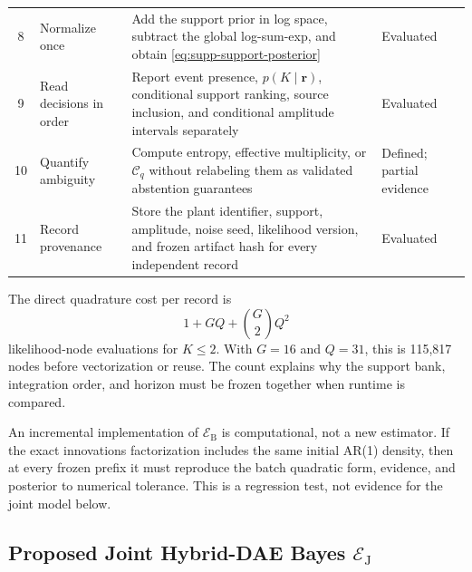 \begin{table}[t]
\begin{tabularx}{\textwidth}{@{}c l X l@{}}
8 & Normalize once & Add the support prior in log space, subtract the global log-sum-exp, and obtain \eqref{eq:supp-support-posterior} & Evaluated \\
9 & Read decisions in order & Report event presence, $p(K\mid\bm r)$, conditional support ranking, source inclusion, and conditional amplitude intervals separately & Evaluated \\
10 & Quantify ambiguity & Compute entropy, effective multiplicity, or $\mathcal C_q$ without relabeling them as validated abstention guarantees & Defined; partial evidence \\
11 & Record provenance & Store the plant identifier, support, amplitude, noise seed, likelihood version, and frozen artifact hash for every independent record & Evaluated \\
\bottomrule
\end{tabularx}
\end{table}

The direct quadrature cost per record is
\begin{equation}
 1+GQ+\binom{G}{2}Q^2
 \label{eq:supp-gh-complexity}
\end{equation}
likelihood-node evaluations for $K\le2$. With $G=16$ and $Q=31$, this is 115,817 nodes before vectorization or reuse. The count explains why the support bank, integration order, and horizon must be frozen together when runtime is compared.

An incremental implementation of $\mathcal E_{\mathrm B}$ is computational,
not a new estimator. If the exact innovations factorization includes the same
initial AR(1) density, then at every frozen prefix it must reproduce the batch
quadratic form, evidence, and posterior to numerical tolerance. This is a
regression test, not evidence for the joint model below.

\subsection{Proposed Joint Hybrid-DAE Bayes $\mathcal E_{\mathrm J}$}
\label{sec:supp-joint-design}

